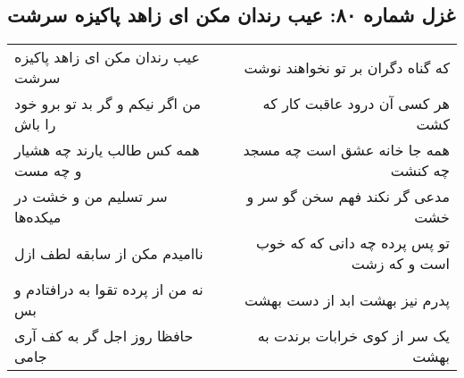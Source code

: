 \begin{center}
\section*{غزل شماره ۸۰: عیب رندان مکن ای زاهد پاکیزه سرشت}
\label{sec:sh080}
\begin{longtable}{l p{0.5cm} r}
عیب رندان مکن ای زاهد پاکیزه سرشت
&&
که گناه دگران بر تو نخواهند نوشت
\\
من اگر نیکم و گر بد تو برو خود را باش
&&
هر کسی آن درود عاقبت کار که کشت
\\
همه کس طالب یارند چه هشیار و چه مست
&&
همه جا خانه عشق است چه مسجد چه کنشت
\\
سر تسلیم من و خشت در میکده‌ها
&&
مدعی گر نکند فهم سخن گو سر و خشت
\\
ناامیدم مکن از سابقه لطف ازل
&&
تو پس پرده چه دانی که که خوب است و که زشت
\\
نه من از پرده تقوا به درافتادم و بس
&&
پدرم نیز بهشت ابد از دست بهشت
\\
حافظا روز اجل گر به کف آری جامی
&&
یک سر از کوی خرابات برندت به بهشت
\\
\end{longtable}
\end{center}
